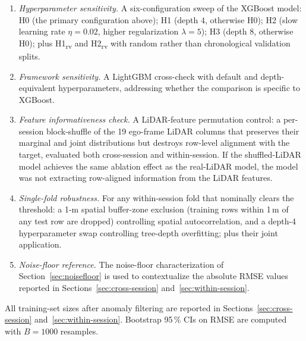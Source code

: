 \documentclass[conference]{IEEEtran}
\begin{document}
\begin{enumerate}
    \item \textit{Hyperparameter sensitivity.} A six-configuration sweep of the XGBoost model: H0 (the primary configuration above); H1 (depth $4$, otherwise H0); H2 (slow learning rate $\eta = 0.02$, higher regularization $\lambda = 5$); H3 (depth $8$, otherwise H0); plus H1\textsubscript{rv} and H2\textsubscript{rv} with random rather than chronological validation splits.
    \item \textit{Framework sensitivity.} A LightGBM cross-check with default and depth-equivalent hyperparameters, addressing whether the comparison is specific to XGBoost.
    \item \textit{Feature informativeness check.} A LiDAR-feature permutation control: a per-session block-shuffle of the 19   ego-frame LiDAR columns that preserves their marginal and joint distributions but destroys row-level alignment with the target, evaluated both cross-session and within-session. If the shuffled-LiDAR model achieves the same ablation effect as the real-LiDAR model, the model was not extracting row-aligned information from the LiDAR features.
    \item \textit{Single-fold robustness.} For any within-session fold that nominally clears the threshold: a 1-m spatial buffer-zone exclusion (training rows within 1\,m of any test row are dropped) controlling spatial autocorrelation, and a depth-4 hyperparameter swap controlling tree-depth overfitting; plus their joint application.
    \item \textit{Noise-floor reference.} The noise-floor characterization of Section~\ref{sec:noisefloor} is used to contextualize the absolute RMSE values reported in   Sections~\ref{sec:cross-session} and~\ref{sec:within-session}.
\end{enumerate}

All training-set sizes after anomaly filtering are reported in Sections~\ref{sec:cross-session} and~\ref{sec:within-session}. Bootstrap 95\,\% CIs on RMSE are computed with $B = 1000$ resamples.
\end{document}

